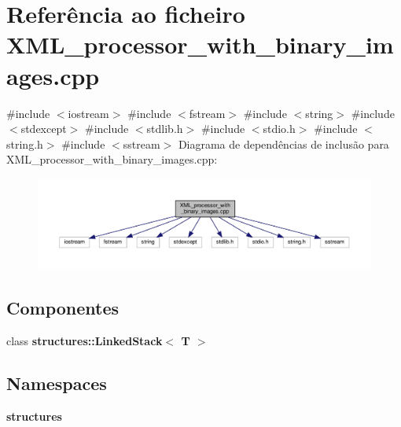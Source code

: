 \section{Referência ao ficheiro X\+M\+L\+\_\+processor\+\_\+with\+\_\+binary\+\_\+images.\+cpp}
\label{_x_m_l__processor__with__binary__images_8cpp}
{\ttfamily \#include $<$iostream$>$}\newline
{\ttfamily \#include $<$fstream$>$}\newline
{\ttfamily \#include $<$string$>$}\newline
{\ttfamily \#include $<$stdexcept$>$}\newline
{\ttfamily \#include $<$stdlib.\+h$>$}\newline
{\ttfamily \#include $<$stdio.\+h$>$}\newline
{\ttfamily \#include $<$string.\+h$>$}\newline
{\ttfamily \#include $<$sstream$>$}\newline
Diagrama de dependências de inclusão para X\+M\+L\+\_\+processor\+\_\+with\+\_\+binary\+\_\+images.\+cpp\+:
\nopagebreak
\begin{figure}[H]
\begin{center}
\leavevmode
\includegraphics[width=350pt]{_x_m_l__processor__with__binary__images_8cpp__incl}
\end{center}
\end{figure}
\subsection*{Componentes}
\begin{DoxyCompactItemize}
\item 
class \textbf{ structures\+::\+Linked\+Stack$<$ T $>$}
\end{DoxyCompactItemize}
\subsection*{Namespaces}
\begin{DoxyCompactItemize}
\item 
 \textbf{ structures}
\end{DoxyCompactItemize}
